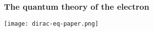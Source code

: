 \begin{frame}
\frametitle{The quantum theory of the electron}

\texttt{[image: dirac-eq-paper.png]}
 
\end{frame}
